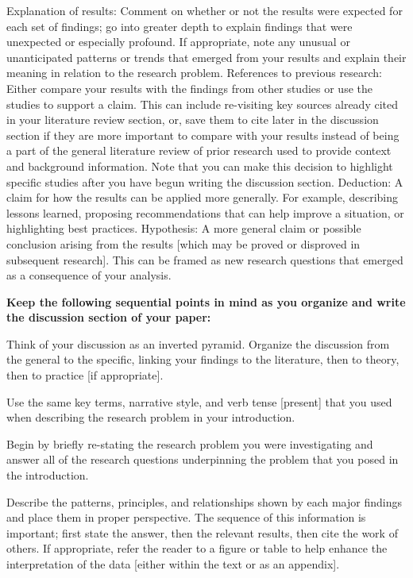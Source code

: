 Explanation of results: Comment on whether or not the results were expected for each set of findings; go into greater depth to explain findings that were unexpected or especially profound. If appropriate, note any unusual or unanticipated patterns or trends that emerged from your results and explain their meaning in relation to the research problem.
References to previous research: Either compare your results with the findings from other studies or use the studies to support a claim. This can include re-visiting key sources already cited in your literature review section, or, save them to cite later in the discussion section if they are more important to compare with your results instead of being a part of the general literature review of prior research used to provide context and background information. Note that you can make this decision to highlight specific studies after you have begun writing the discussion section.
Deduction: A claim for how the results can be applied more generally. For example, describing lessons learned, proposing recommendations that can help improve a situation, or highlighting best practices.
Hypothesis: A more general claim or possible conclusion arising from the results [which may be proved or disproved in subsequent research]. This can be framed as new research questions that emerged as a consequence of your analysis.


\textbf{Keep the following sequential points in mind as you organize and write the discussion section of your paper:}

Think of your discussion as an inverted pyramid. Organize the discussion from the general to the specific, linking your findings to the literature, then to theory, then to practice [if appropriate].

Use the same key terms, narrative style, and verb tense [present] that you used when describing the research problem in your introduction.

Begin by briefly re-stating the research problem you were investigating and answer all of the research questions underpinning the problem that you posed in the introduction.

Describe the patterns, principles, and relationships shown by each major findings and place them in proper perspective. The sequence of this information is important; first state the answer, then the relevant results, then cite the work of others. If appropriate, refer the reader to a figure or table to help enhance the interpretation of the data [either within the text or as an appendix].

